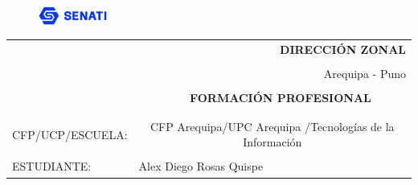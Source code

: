 \begin{figure}
	\includegraphics[width=0.2\textwidth]{img/senati.png}
\end{figure}
\vspace*{1cm}
\begin{table}[ht!]
	\begin{center}
		\begin{tabular}{ c  c  c  c  c  c  }
			\multicolumn{5}{c}{}                 & \multicolumn{1}{r}{\textbf{DIRECCIÓN ZONAL}}                                                                                      \\
			\multicolumn{6}{c}{}                                                                                                                                                     \\
			\multicolumn{5}{c}{}                 & \multicolumn{1}{r}{ Arequipa - Puno}                                                                                              \\
			\multicolumn{6}{c}{}                                                                                                                                                     \\
			\multicolumn{2}{c}{}                 & \multicolumn{2}{c}{}                                                         & \multicolumn{2}{c}{\textbf{FORMACIÓN PROFESIONAL}} \\
			\multicolumn{6}{c}{}                                                                                                                                                     \\
			\multicolumn{6}{c}{}                                                                                                                                                     \\
			\multicolumn{1}{l}{CFP/UCP/ESCUELA:} & \multicolumn{5}{c}{CFP Arequipa/UPC Arequipa /Tecnologías de la Información}                                                      \\
			\multicolumn{6}{c}{}                                                                                                                                                     \\
			\multicolumn{1}{l}{ESTUDIANTE:}      & \multicolumn{5}{l}{Alex Diego Rosas Quispe}                                                                                       \\

\end{tabular}
\end{center}
\end{table}
